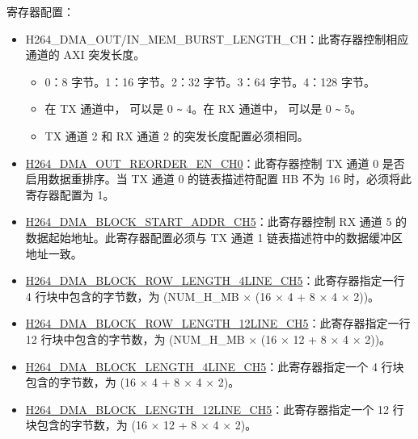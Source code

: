 \documentclass[main\_\_CN.tex]{subfiles}
\begin{document}
寄存器配置：
\begin{itemize}
    \item H264\_DMA\_OUT/IN\_MEM\_BURST\_LENGTH\_CH：此寄存器控制相应通道的 AXI 突发长度。
    \begin{itemize}
        \item 0：8 字节。1：16 字节。2：32 字节。3：64 字节。4：128 字节。
        \item 在 TX 通道中， 可以是 0 \verb+~+ 4。在 RX 通道中， 可以是 0 \verb+~+ 5。
        \item TX 通道 2 和 RX 通道 2 的突发长度配置必须相同。
    \end{itemize}
    \item \hyperref[fielddesc:H264DMAOUTREORDERENCH0]{H264\_DMA\_OUT\_REORDER\_EN\_CH0}：此寄存器控制 TX 通道 0 是否启用数据重排序。当 TX 通道 0 的链表描述符配置 HB 不为 16 时，必须将此寄存器配置为 1。
    \item \hyperref[fielddesc:H264DMABLOCKSTARTADDRCH5]{H264\_DMA\_BLOCK\_START\_ADDR\_CH5}：此寄存器控制 RX 通道 5 的数据起始地址。此寄存器配置必须与 TX 通道 1 链表描述符中的数据缓冲区地址一致。
    \item \hyperref[fielddesc:H264DMABLOCKROWLENGTH4LINECH5]{H264\_DMA\_BLOCK\_ROW\_LENGTH\_4LINE\_CH5}：此寄存器指定一行 4 行块中包含的字节数，为 (NUM\_H\_MB × (16 × 4 + 8 × 4 × 2))。
    \item \hyperref[fielddesc:H264DMABLOCKROWLENGTH12LINECH5]{H264\_DMA\_BLOCK\_ROW\_LENGTH\_12LINE\_CH5}：此寄存器指定一行 12 行块中包含的字节数，为 (NUM\_H\_MB × (16 × 12 + 8 × 4 × 2))。
    \item \hyperref[fielddesc:H264DMABLOCKLENGTH4LINECH5]{H264\_DMA\_BLOCK\_LENGTH\_4LINE\_CH5}：此寄存器指定一个 4 行块包含的字节数，为 (16 × 4 + 8 × 4 × 2)。
    \item \hyperref[fielddesc:H264DMABLOCKLENGTH12LINECH5]{H264\_DMA\_BLOCK\_LENGTH\_12LINE\_CH5}：此寄存器指定一个 12 行块包含的字节数，为 (16 × 12 + 8 × 4 × 2)。
\end{itemize}

\end{document}
